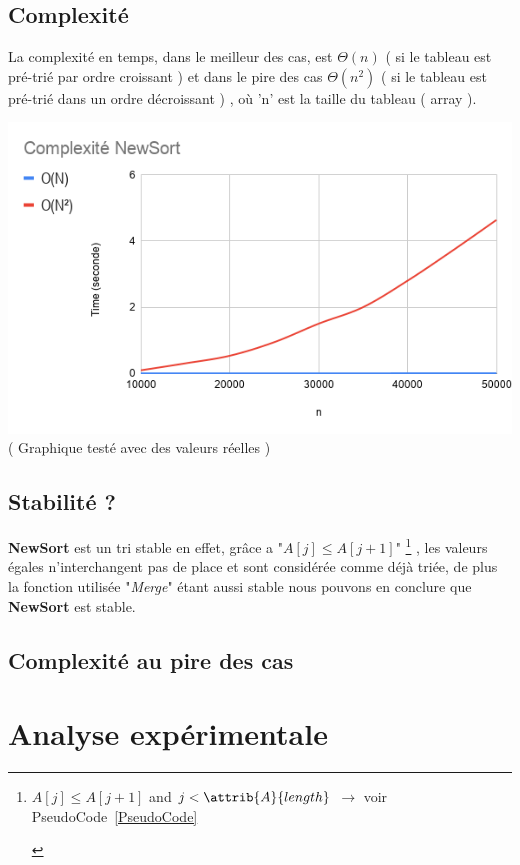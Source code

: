 \documentclass[a4paper, 11pt, oneside]{article}
\begin{document}
\subsection{Complexité}
La complexité en temps, dans le meilleur des cas, est $\Theta(n)$ ( si le tableau est pré-trié par ordre croissant ) et dans le pire des cas $\Theta(n^{2})$ ( si le tableau est pré-trié dans un ordre décroissant ) , où 'n' est la taille du tableau ( array ).

\includegraphics[scale=0.5]{graphique.png} \\
( Graphique testé avec des valeurs réelles ) %


\subsection{Stabilité ?}
\textbf{NewSort}
 est un tri stable en effet, grâce a "\textit{$A[j]\leq A[j+1]$}"
	\footnote{\begin{codebox}
	

\li \While $A[j] \leq A[j+1]$ and $j < \attrib{A}{length}$
$\longrightarrow$ voir PseudoCode~\ref{PseudoCode}
\End
\end{codebox} }
, les valeurs égales n'interchangent pas de place et sont considérée comme déjà triée, de plus la fonction utilisée "\textit{Merge}" étant aussi stable nous pouvons en conclure que \textbf{NewSort} est stable. 


\subsection{Complexité au pire des cas}
\newpage

\section{Analyse expérimentale}
\end{document}
